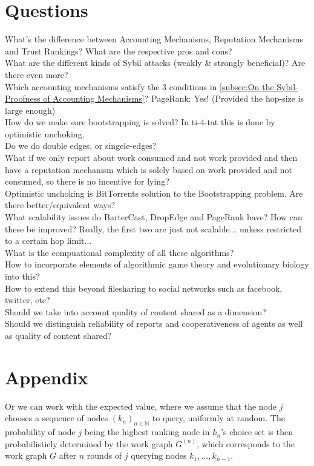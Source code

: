 \documentclass[11pt,a4paper]{report}
\theoremstyle{definition}
\theoremstyle{theorem}
\theoremstyle{proposition}
\theoremstyle{corollary}
\theoremstyle{lemma}
\theoremstyle{example}
\theoremstyle{remark}
\begin{document}
\section{Questions}
\label{sec:Questions}
What's the difference between Accounting Mechanisms, Reputation Mechanisms and Trust Rankings? What are the respective pros and cons?\\
What are the different kinds of Sybil attacks (weakly \& strongly beneficial)? Are there even more?\\
Which accounting mechanisms satisfy the 3 conditions in \ref{subsec:On the Sybil-Proofness of Accounting Mechanisms}? PageRank: Yes! (Provided the hop-size is large enough)\\
How do we make sure bootstrapping is solved? In ti-4-tat this is done by optimistic unchoking.\\
Do we do double edges, or singele-edges?\\
What if we only report about work consumed and not work provided and then have a reputation mechanism which is solely based on work provided and not consumed, so there is no incentive for lying?\\
Optimistic unchoking is BitTorrents solution to the Bootstrapping problem. Are there better/equivalent ways?\\
What scalability issues do BarterCast, DropEdge and PageRank have? How can these be improved? Really, the first two are just not scalable... unkess restricted to a certain hop limit...\\
What is the compuational complexity of all these algorithms?\\
How to incorporate elements of algorithmic game theory and evolutionary biology into this?\\
How to extend this beyond filesharing to social networks such as facebook, twitter, etc?\\
Should we take into account quality of content shared as a dimension?\\
Should we distinguish reliability of reports and cooperativeness of agents as well as quality of content shared?\\









\section{Appendix}
\label{sec:Appendix}
\noindent{}Or we can work with the expected value, where we assume that the node $j$ chooses a sequence of nodes $(k_n)_{n\in\mathbb{N}}$ to query, uniformly at random. The probability of node $j$ being the highest ranking node in $k_n$'s choice set is then probabilisticly determined by the work graph $G^{(n)}$, which corresponds to the work graph $G$ after $n$ rounds of $j$ querying nodes $k_1,\ldots,k_{n-1}$.   
\end{document}
